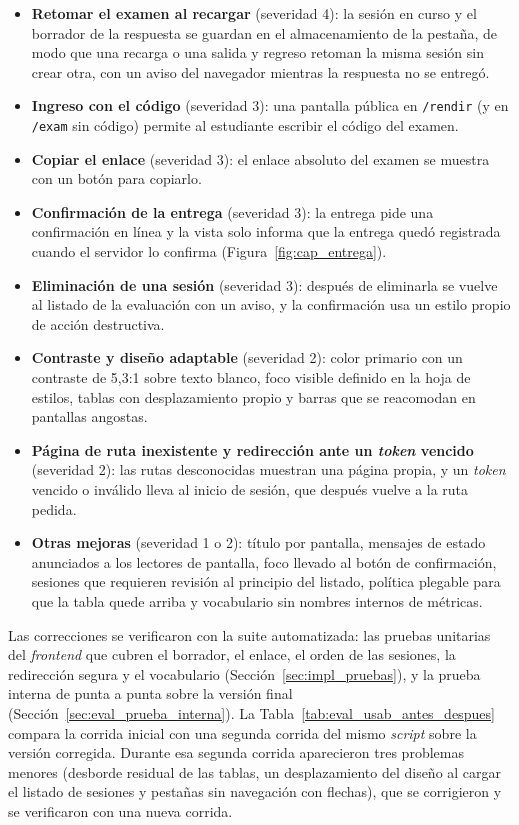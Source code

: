 \begin{itemize}
    \item \textbf{Retomar el examen al recargar} (severidad 4): la sesión en curso y el borrador de la respuesta se guardan en el almacenamiento de la pestaña, de modo que una recarga o una salida y regreso retoman la misma sesión sin crear otra, con un aviso del navegador mientras la respuesta no se entregó.
    \item \textbf{Ingreso con el código} (severidad 3): una pantalla pública en \texttt{/rendir} (y en \texttt{/exam} sin código) permite al estudiante escribir el código del examen.
    \item \textbf{Copiar el enlace} (severidad 3): el enlace absoluto del examen se muestra con un botón para copiarlo.
    \item \textbf{Confirmación de la entrega} (severidad 3): la entrega pide una confirmación en línea y la vista solo informa que la entrega quedó registrada cuando el servidor lo confirma (Figura~\ref{fig:cap_entrega}).
    \item \textbf{Eliminación de una sesión} (severidad 3): después de eliminarla se vuelve al listado de la evaluación con un aviso, y la confirmación usa un estilo propio de acción destructiva.
    \item \textbf{Contraste y diseño adaptable} (severidad 2): color primario con un contraste de 5,3:1 sobre texto blanco, foco visible definido en la hoja de estilos, tablas con desplazamiento propio y barras que se reacomodan en pantallas angostas.
    \item \textbf{Página de ruta inexistente y redirección ante un \textit{token} vencido} (severidad 2): las rutas desconocidas muestran una página propia, y un \textit{token} vencido o inválido lleva al inicio de sesión, que después vuelve a la ruta pedida.
    \item \textbf{Otras mejoras} (severidad 1 o 2): título por pantalla, mensajes de estado anunciados a los lectores de pantalla, foco llevado al botón de confirmación, sesiones que requieren revisión al principio del listado, política plegable para que la tabla quede arriba y vocabulario sin nombres internos de métricas.
\end{itemize}

Las correcciones se verificaron con la suite automatizada: las pruebas unitarias del \textit{frontend} que cubren el borrador, el enlace, el orden de las sesiones, la redirección segura y el vocabulario (Sección~\ref{sec:impl_pruebas}), y la prueba interna de punta a punta sobre la versión final (Sección~\ref{sec:eval_prueba_interna}).
La Tabla~\ref{tab:eval_usab_antes_despues} compara la corrida inicial con una segunda corrida del mismo \textit{script} sobre la versión corregida. Durante esa segunda corrida aparecieron tres problemas menores (desborde residual de las tablas, un desplazamiento del diseño al cargar el listado de sesiones y pestañas sin navegación con flechas), que se corrigieron y se verificaron con una nueva corrida.

